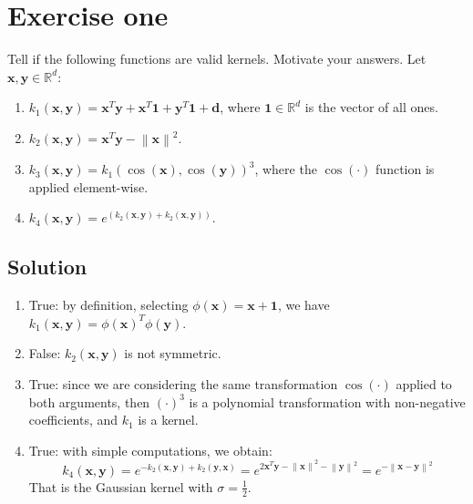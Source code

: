 \section{Exercise one}

Tell if the following functions are valid kernels. 
Motivate your answers. 
Let $\mathbf{x}, \mathbf{y} \in\mathbb{R}^d$:
\begin{enumerate}
    \item $k_1(\mathbf{x}, \mathbf{y}) = \mathbf{x}^T \mathbf{y} + \mathbf{x}^T \mathbf{1} + \mathbf{y}^T \mathbf{1} + \mathbf{d}$, where $\mathbf{1} \in \mathbb{R}^d$ is the vector of all ones.
    \item $k_2(\mathbf{x}, \mathbf{y}) = \mathbf{x}^T\mathbf{y} - \left\lVert \mathbf{x}\right\rVert ^2$.
    \item $k_3(\mathbf{x}, \mathbf{y}) = k_1(\cos(\mathbf{x}), \cos(\mathbf{y}))^3$, where the $\cos(\cdot)$ function is applied element-wise.
    \item $k_4(\mathbf{x}, \mathbf{y}) = e^{(k_2(\mathbf{x}, \mathbf{y}) + k_2(\mathbf{x}, \mathbf{y}))}$.
\end{enumerate}

\subsection*{Solution}
\begin{enumerate}
    \item True: by definition, selecting $\phi(\mathbf{x}) = \mathbf{x} + \mathbf{1}$, we have $k_1(\mathbf{x}, \mathbf{y}) = \phi(\mathbf{x})^T \phi(\mathbf{y})$.
    \item False: $k_2(\mathbf{x}, \mathbf{y})$ is not symmetric.
    \item True: since we are considering the same transformation $\cos(\cdot)$ applied to both arguments, then $(\cdot)^3$ is a polynomial transformation with non-negative coefficients, and $k_1$ is a kernel.
    \item True: with simple computations, we obtain:
        \[k_4(\mathbf{x}, \mathbf{y}) = e^{-k_2(\mathbf{x}, \mathbf{y}) + k_2(\mathbf{y}, \mathbf{x})}= e^{2\mathbf{x}^T\mathbf{y}-\left\lVert \mathbf{x}\right\rVert ^2-\left\lVert \mathbf{y}\right\rVert ^2}= e^{-\left\lVert \mathbf{x}-\mathbf{y}\right\rVert ^2}\]
        That is the Gaussian kernel with $\sigma=\frac{1}{2}$.
\end{enumerate}